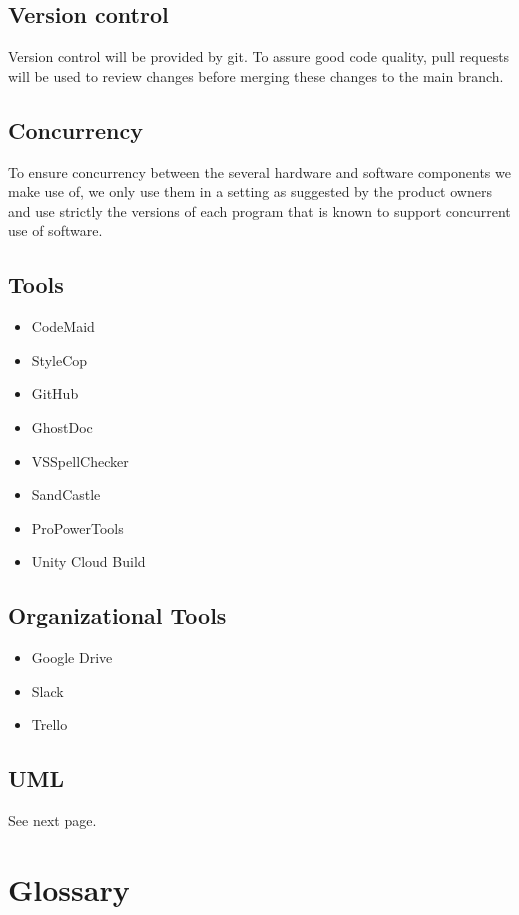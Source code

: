 \documentclass[11pt,a4paper]{report}
\begin{document}
\section{Version control}
Version control will be provided by git. To assure good code quality, pull requests will be
used to review changes before merging these changes to the main branch.
\section{Concurrency}
To ensure concurrency between the several hardware and software components we make use
of, we only use them in a setting as suggested by the product owners and use 
strictly the
versions of each program that is known to support concurrent use of software.
\section{Tools}
\begin{itemize}
\item CodeMaid
\item StyleCop
\item GitHub
\item GhostDoc
\item VSSpellChecker
\item SandCastle
\item ProPowerTools
\item Unity Cloud Build
\end{itemize}
\section{Organizational Tools}
\begin{itemize}
\item Google Drive
\item Slack
\item Trello
\end{itemize}

\section{UML}
See next page.









\chapter{Glossary}
\end{document}
